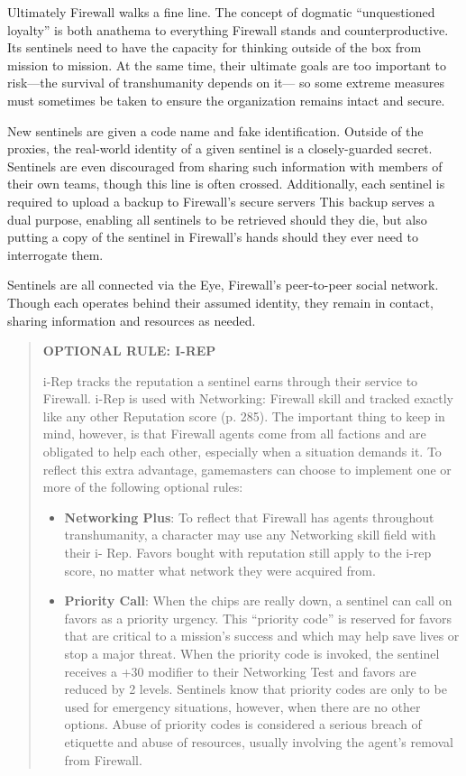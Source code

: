 Ultimately Firewall walks a fine line. The concept of dogmatic ``unquestioned loyalty'' is both anathema to everything Firewall stands and counterproductive. Its sentinels need to have the capacity for thinking outside of the box from mission to mission. At the same time, their ultimate goals are too important to risk—the survival of transhumanity depends on it— so some extreme measures must sometimes be taken to ensure the organization remains intact and secure. 

New sentinels are given a code name and fake identification. Outside of the proxies, the real-world identity of a given sentinel is a closely-guarded secret. Sentinels are even discouraged from sharing such information with members of their own teams, though this line is often crossed. Additionally, each sentinel is required to upload a backup to Firewall's secure servers This backup serves a dual purpose, enabling all sentinels to be retrieved should they die, but also putting a copy of the sentinel in Firewall's hands should they ever need to interrogate them. 

Sentinels are all connected via the Eye, Firewall's peer-to-peer social network. Though each operates behind their assumed identity, they remain in contact, sharing information and resources as needed. 

\begin{quotation} \textbf{OPTIONAL RULE: I-REP} 

i-Rep tracks the reputation a sentinel earns through their service to Firewall. i-Rep is used with Networking: Firewall skill and tracked exactly like any other Reputation score (p. 285). The important thing to keep in mind, however, is that Firewall agents come from all factions and are obligated to help each other, especially when a situation demands it. To reflect this extra advantage, gamemasters can choose to implement one or more of the following optional rules: \begin{itemize} \item \textbf{Networking Plus}: To reflect that Firewall has agents throughout transhumanity, a character may use any Networking skill field with their i- Rep. Favors bought with reputation still apply to the i-rep score, no matter what network they were acquired from. \item \textbf{Priority Call}: When the chips are really down, a sentinel can call on favors as a priority urgency. This “priority code” is reserved for favors that are critical to a mission’s success and which may help save lives or stop a major threat. When the priority code is invoked, the sentinel receives a +30 modifier to their Networking Test and favors are reduced by 2 levels. Sentinels know that priority codes are only to be used for emergency situations, however, when there are no other options. Abuse of priority codes is considered a serious breach of etiquette and abuse of resources, usually involving the agent’s removal from Firewall. \end{itemize} \end{quotation} 



